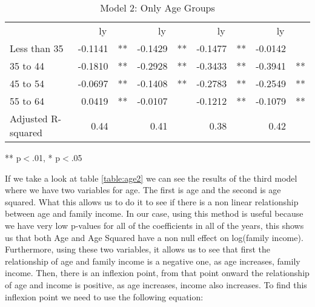 \documentclass[12pt]{article}
\begin{document}
\begin{spacing}{1.5}
\begin{table}[!h]
\caption{Model 2: Only Age Groups}
\centering
\begin{tabular}{lllllllll}
\cline{1-9}
\multicolumn{1}{r}{} &
  \multicolumn{2}{c}{ly} &
  \multicolumn{2}{c}{ly} &
  \multicolumn{2}{c}{ly} &
  \multicolumn{2}{c}{ly} \\
\cline{1-9}
\multicolumn{1}{l}{Less than 35} &
  \multicolumn{1}{r}{-0.1141} &
  \multicolumn{1}{l}{**} &
  \multicolumn{1}{r}{-0.1429} &
  \multicolumn{1}{l}{**} &
  \multicolumn{1}{r}{-0.1477} &
  \multicolumn{1}{l}{**} &
  \multicolumn{1}{r}{-0.0142} &
  \multicolumn{1}{l}{} \\
\multicolumn{1}{l}{35 to 44} &
  \multicolumn{1}{r}{-0.1810} &
  \multicolumn{1}{l}{**} &
  \multicolumn{1}{r}{-0.2928} &
  \multicolumn{1}{l}{**} &
  \multicolumn{1}{r}{-0.3433} &
  \multicolumn{1}{l}{**} &
  \multicolumn{1}{r}{-0.3941} &
  \multicolumn{1}{l}{**} \\
\multicolumn{1}{l}{45 to 54} &
  \multicolumn{1}{r}{-0.0697} &
  \multicolumn{1}{l}{**} &
  \multicolumn{1}{r}{-0.1408} &
  \multicolumn{1}{l}{**} &
  \multicolumn{1}{r}{-0.2783} &
  \multicolumn{1}{l}{**} &
  \multicolumn{1}{r}{-0.2549} &
  \multicolumn{1}{l}{**} \\
\multicolumn{1}{l}{55 to 64} &
  \multicolumn{1}{r}{0.0419} &
  \multicolumn{1}{l}{**} &
  \multicolumn{1}{r}{-0.0107} &
  \multicolumn{1}{l}{} &
  \multicolumn{1}{r}{-0.1212} &
  \multicolumn{1}{l}{**} &
  \multicolumn{1}{r}{-0.1079} &
  \multicolumn{1}{l}{**} \\
\multicolumn{1}{l}{Adjusted R-squared} &
  \multicolumn{1}{r}{0.44} &
  \multicolumn{1}{l}{} &
  \multicolumn{1}{r}{0.41} &
  \multicolumn{1}{l}{} &
  \multicolumn{1}{r}{0.38} &
  \multicolumn{1}{l}{} &
  \multicolumn{1}{r}{0.42} &
  \multicolumn{1}{l}{} \\
\cline{1-9}
\end{tabular}

\footnotesize{
** p$<$.01, * p$<$.05
}
\label{table:age1}
\end{table}

If we take a look at table \ref{table:age2} we can see the results of the third model where we have two variables for age. The first is age and the second is age squared. What this allows us to do it to see if there is a non linear relationship between age and family income. In our case, using this method is useful because we have very low p-values for all of the coefficients in all of the years, this shows us that both Age and Age Squared have a non null effect on log(family income). Furthermore, using these two variables, it allows us to see that first the relationship of age and family income is a negative one, as age increases, family income. Then, there is an inflexion point, from that point onward the relationship of age and income is positive, as age increases, income also increases. To find this inflexion point we need to use the following equation:


\end{spacing}
\end{document}
